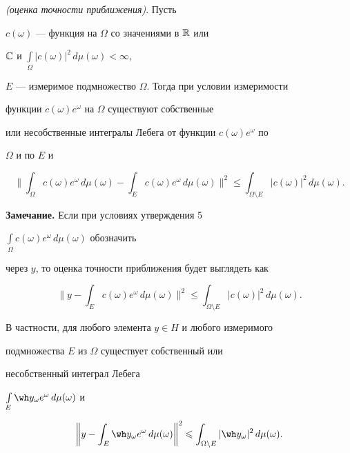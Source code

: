 \begin{assrt} {\em (оценка точности приближения)}. Пусть


$c(\omega)$ --- функция на $\Omega$ со значениями в $\Bbb R$ или


$\Bbb C$ и $\int\limits_\Omega|c(\omega)|^2\,d\mu(\omega)<\infty$,


$E$ --- измеримое подмножество $\Omega$. Тогда при условии измеримости


функции $c(\omega)e^\omega$ на $\Omega$ существуют собственные


или несобственные интегралы Лебега от функции $c(\omega)e^\omega$ по


$\Omega$ и по $E$ и


$$


\bigg\| \int_\Omega c(\omega)e^\omega\,d\mu(\omega)-


\int_E c(\omega)e^\omega\,d\mu(\omega)\bigg\|^2\leqslant


\int_{\Omega\setminus E}|c(\omega)|^2\,d\mu(\omega).


$$


\end{assrt}





{\bf Замечание.} Если при условиях утверждения 5\;


$\int\limits_\Omega c(\omega)e^\omega\,d\mu(\omega)$ обозначить


через $y$, то оценка точности приближения будет выглядеть как


$$


\bigg\|y-\int_E c(\omega)e^\omega\,d\mu(\omega)\bigg\|^2


\leqslant\int_{\Omega\setminus E}|c(\omega)|^2\,d\mu(\omega).


$$


В частности, для любого элемента $y\in H$ и любого измеримого


подмножества $E$ из $\Omega$ существует собственный или


несобственный интеграл Лебега


$\int\limits_E\wh y_\omega e^\omega\,d\mu(\omega)$ и


$$


\bigg\| y-\int_E\wh y_\omega e^\omega\,d\mu(\omega)\bigg


\|^2\leqslant\int_{\Omega\setminus E}|\wh y_\omega|^2\,


d\mu(\omega).


$$





